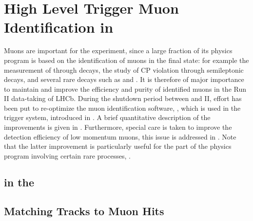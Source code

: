 \chapter{High Level Trigger Muon Identification in \runtwo}
\label{Muon_id_hlt}

Muons are important for the \lhcb experiment, since a large fraction of its physics program is based on
the identification of muons in the final state: for example the measurement of \phis through \BsJpsiPhi decays,
the study of CP violation through semileptonic decays, and several rare decays such as \BdKstmumu and \Bsmm.
It is therefore of major importance to maintain and improve the efficiency and purity of identified muons in
the Run II data-taking of LHCb. During the shutdown period between \runone and II, effort has been put to
re-optimize the muon identification software, \muonID, which is used in the \lhcb trigger system, introduced in .
A brief quantitative description of the \muonID improvements is given in .
Furthermore, special care is taken to improve the detection efficiency of low momentum muons, this issue is
addressed in . Note that the latter improvement is particularly useful for the part
of the \lhcb physics program involving certain rare processes, \eg \cite{LHCB-CONF-2016-013-001,LHCb-CONF-2016-012}.

\section{\hltone \muonID in the \lhc \runtwo}
\label{muid_hlt1}


\section{Matching \velo Tracks to Muon Hits}
\label{mvm_algorrithm}

